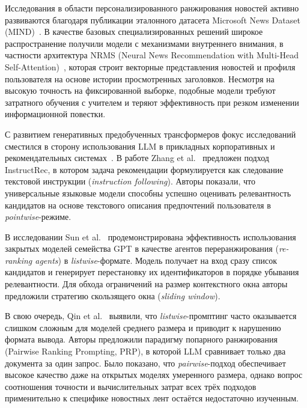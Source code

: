 \documentclass{misisarticle}
\begin{document}
Исследования в области персонализированного ранжирования новостей активно развиваются благодаря публикации эталонного датасета Microsoft News Dataset (MIND)~\cite{wu2020mind}. В качестве базовых специализированных решений широкое распространение получили модели с механизмами внутреннего внимания, в частности архитектура NRMS (Neural News Recommendation with Multi-Head Self-Attention)~\cite{wu2019nrms}, которая строит векторные представления новостей и профиля пользователя на основе истории просмотренных заголовков. Несмотря на высокую точность на фиксированной выборке, подобные модели требуют затратного обучения с учителем и теряют эффективность при резком изменении информационной повестки.

С развитием генеративных предобученных трансформеров фокус исследований сместился в сторону использования LLM в прикладных корпоративных и рекомендательных системах~\cite{beresnev2023chatbots, sosedka2024telegram}. В работе Zhang et al.~\cite{zhang2025recommendation} предложен подход InstructRec, в котором задача рекомендации формулируется как следование текстовой инструкции (\textit{instruction following}). Авторы показали, что универсальные языковые модели способны успешно оценивать релевантность кандидатов на основе текстового описания предпочтений пользователя в \textit{pointwise}-режиме.

В исследовании Sun et al.~\cite{sun2023chatgpt} продемонстрирована эффективность использования закрытых моделей семейства GPT в качестве агентов переранжирования (\textit{re-ranking agents}) в \textit{listwise}-формате. Модель получает на вход сразу список кандидатов и генерирует перестановку их идентификаторов в порядке убывания релевантности. Для обхода ограничений на размер контекстного окна авторы предложили стратегию скользящего окна (\textit{sliding window}).

В свою очередь, Qin et al.~\cite{qin2024pairwise} выявили, что \textit{listwise}-промптинг часто оказывается слишком сложным для моделей среднего размера и приводит к нарушению формата вывода. Авторы предложили парадигму попарного ранжирования (Pairwise Ranking Prompting, PRP), в которой LLM сравнивает только два документа за один запрос. Было показано, что \textit{pairwise}-подход обеспечивает высокое качество даже на открытых моделях умеренного размера, однако вопрос соотношения точности и вычислительных затрат всех трёх подходов применительно к специфике новостных лент остаётся недостаточно изученным.

\end{document}
